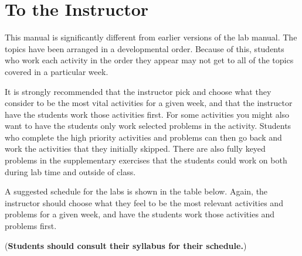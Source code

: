 \documentclass[12pt,]{book}
\theoremstyle{plain}
\theoremstyle{definition}
\numberwithin{equation}{section}
\begin{document}
\chapter*{To the Instructor}\label{to-the-instructor}
This manual is significantly different from earlier versions of the lab manual. The topics have been arranged in a developmental order. Because of this, students who work each activity in the order they appear may not get to all of the topics covered in a particular week.%
\par
It is strongly recommended that the instructor pick and choose what they consider to be the most vital activities for a given week, and that the instructor have the students work those activities first. For some activities you might also want to have the students only work selected problems in the activity. Students who complete the high priority activities and problems can then go back and work the activities that they initially skipped. There are also fully keyed problems in the supplementary exercises that the students could work on both during lab time and outside of class.%
\par
A suggested schedule for the labs is shown in the table below. Again, the instructor should choose what they feel to be the most relevant activities and problems for a given week, and have the students work those activities and problems first.%
\par
(\textbf{Students should consult their syllabus for their schedule.})%
\end{document}

